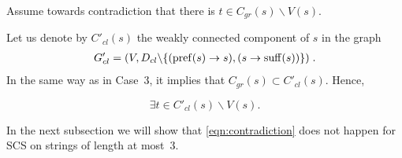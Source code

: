 Assume towards contradiction that there is $ t \in C_{gr} (s) \backslash V (s) $.

Let us denote by $ C'_{cl} (s) $ the weakly connected component of $s$ in the graph 
\begin{align*}
G'_{cl} = (V, D_{cl} \backslash \{(\operatorname{pref} (s) \to s), (s \to \operatorname{suff} (s)) \}) \; .
\end{align*}
 In the same way as in Case~3, it implies that  $ C_{gr} (s) \subset C'_{cl} (s) $. Hence,

\begin{equation}
\label{eqn:contradiction}
    \exists t \in C'_{cl}(s) \backslash V(s).
\end{equation}

In the next subsection we will show that \ref{eqn:contradiction} does not happen for SCS on strings of length at most~$3$.